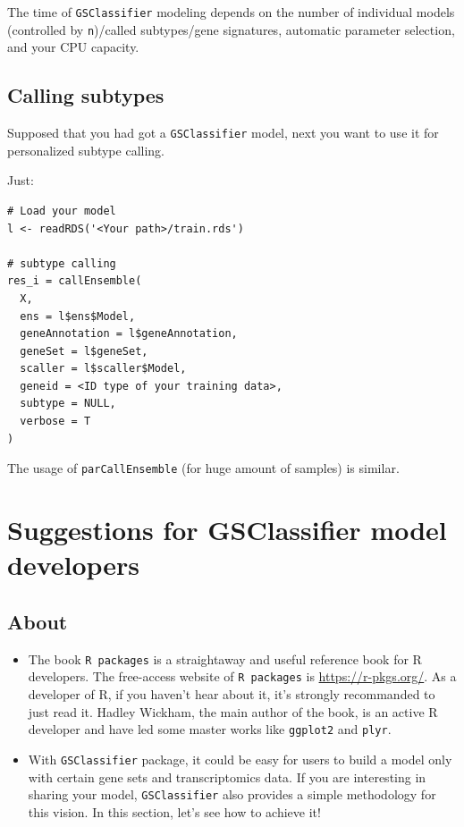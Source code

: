 \documentclass[
  12pt,
]{book}
\begin{document}
The time of \texttt{GSClassifier} modeling depends on the number of individual models (controlled by \texttt{n})/called subtypes/gene signatures, automatic parameter selection, and your CPU capacity.

\hypertarget{calling-subtypes}{%
\section{Calling subtypes}\label{calling-subtypes}}

Supposed that you had got a \texttt{GSClassifier} model, next you want to use it for personalized subtype calling.

Just:

\begin{verbatim}
# Load your model
l <- readRDS('<Your path>/train.rds')

# subtype calling
res_i = callEnsemble(
  X,
  ens = l$ens$Model,
  geneAnnotation = l$geneAnnotation,
  geneSet = l$geneSet,
  scaller = l$scaller$Model,
  geneid = <ID type of your training data>,
  subtype = NULL,
  verbose = T
)
\end{verbatim}

The usage of \texttt{parCallEnsemble} (for huge amount of samples) is similar.

\hypertarget{suggestions-for-gsclassifier-model-developers}{%
\chapter{Suggestions for GSClassifier model developers}\label{suggestions-for-gsclassifier-model-developers}}

\hypertarget{about-2}{%
\section{About}\label{about-2}}

\begin{itemize}
\item
  The book \texttt{R\ packages} is a straightaway and useful reference book for R developers. The free-access website of \texttt{R\ packages} is \url{https://r-pkgs.org/}. As a developer of R, if you haven't hear about it, it's strongly recommanded to just read it. Hadley Wickham, the main author of the book, is an active R developer and have led some master works like \texttt{ggplot2} and \texttt{plyr}.
\item
  With \texttt{GSClassifier} package, it could be easy for users to build a model only with certain gene sets and transcriptomics data. If you are interesting in sharing your model, \texttt{GSClassifier} also provides a simple methodology for this vision. In this section, let's see how to achieve it!
\end{itemize}
\end{document}
